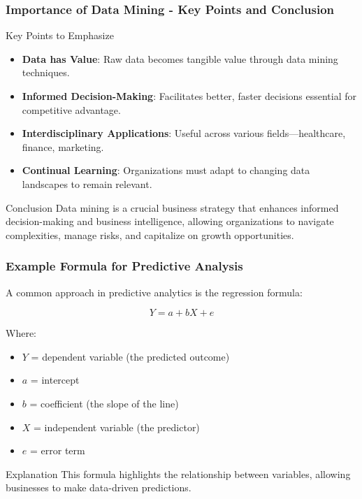 \documentclass[aspectratio=169]{beamer}
\begin{document}
\begin{frame}[fragile]
    \frametitle{Importance of Data Mining - Key Points and Conclusion}
    \begin{block}{Key Points to Emphasize}
        \begin{itemize}
            \item \textbf{Data has Value}: Raw data becomes tangible value through data mining techniques.
            \item \textbf{Informed Decision-Making}: Facilitates better, faster decisions essential for competitive advantage.
            \item \textbf{Interdisciplinary Applications}: Useful across various fields—healthcare, finance, marketing.
            \item \textbf{Continual Learning}: Organizations must adapt to changing data landscapes to remain relevant.
        \end{itemize}
    \end{block}
    
    \begin{block}{Conclusion}
        Data mining is a crucial business strategy that enhances informed decision-making and business intelligence, allowing organizations to navigate complexities, manage risks, and capitalize on growth opportunities.
    \end{block}
\end{frame}

\begin{frame}[fragile]
    \frametitle{Example Formula for Predictive Analysis}
    A common approach in predictive analytics is the regression formula:
    
    \begin{equation}
        Y = a + bX + e
    \end{equation}
    
    Where:
    \begin{itemize}
        \item \(Y\) = dependent variable (the predicted outcome)
        \item \(a\) = intercept
        \item \(b\) = coefficient (the slope of the line)
        \item \(X\) = independent variable (the predictor)
        \item \(e\) = error term
    \end{itemize}
    
    \begin{block}{Explanation}
        This formula highlights the relationship between variables, allowing businesses to make data-driven predictions.
    \end{block}
\end{frame}
\end{document}
